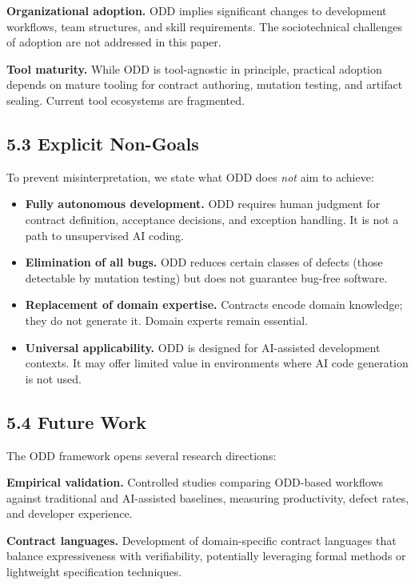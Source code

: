 \documentclass[
]{article}
\begin{document}
\textbf{Organizational adoption.} ODD implies significant changes to
development workflows, team structures, and skill requirements. The
sociotechnical challenges of adoption are not addressed in this paper.

\textbf{Tool maturity.} While ODD is tool-agnostic in principle,
practical adoption depends on mature tooling for contract authoring,
mutation testing, and artifact sealing. Current tool ecosystems are
fragmented.

\hypertarget{53-explicit-non-goals}{%
\subsection{5.3 Explicit Non-Goals}\label{53-explicit-non-goals}}

To prevent misinterpretation, we state what ODD does \emph{not} aim to
achieve:

\begin{itemize}
\item
  \textbf{Fully autonomous development.} ODD requires human judgment for
  contract definition, acceptance decisions, and exception handling. It
  is not a path to unsupervised AI coding.
\item
  \textbf{Elimination of all bugs.} ODD reduces certain classes of
  defects (those detectable by mutation testing) but does not guarantee
  bug-free software.
\item
  \textbf{Replacement of domain expertise.} Contracts encode domain
  knowledge; they do not generate it. Domain experts remain essential.
\item
  \textbf{Universal applicability.} ODD is designed for AI-assisted
  development contexts. It may offer limited value in environments where
  AI code generation is not used.
\end{itemize}

\hypertarget{54-future-work}{%
\subsection{5.4 Future Work}\label{54-future-work}}

The ODD framework opens several research directions:

\textbf{Empirical validation.} Controlled studies comparing ODD-based
workflows against traditional and AI-assisted baselines, measuring
productivity, defect rates, and developer experience.

\textbf{Contract languages.} Development of domain-specific contract
languages that balance expressiveness with verifiability, potentially
leveraging formal methods or lightweight specification techniques.
\end{document}
